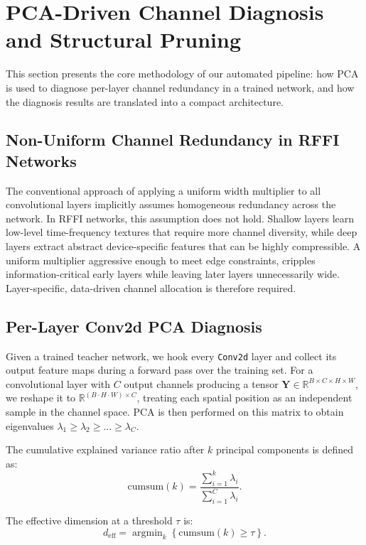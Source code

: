 \documentclass[10pt, conference]{IEEEtran}
\DeclareMathOperator*{\argmin}{argmin}
\begin{document}
\section{PCA-Driven Channel Diagnosis and Structural Pruning}

This section presents the core methodology of our automated pipeline: how PCA is used to diagnose per-layer channel redundancy in a trained network, and how the diagnosis results are translated into a compact architecture.

\subsection{Non-Uniform Channel Redundancy in RFFI Networks}

The conventional approach of applying a uniform width multiplier to all convolutional layers implicitly assumes homogeneous redundancy across the network.
In RFFI networks, this assumption does not hold.
Shallow layers learn low-level time-frequency textures that require more channel diversity, while deep layers extract abstract device-specific features that can be highly compressible.
A uniform multiplier aggressive enough to meet edge constraints, cripples information-critical early layers while leaving later layers unnecessarily wide.
Layer-specific, data-driven channel allocation is therefore required.

\subsection{Per-Layer Conv2d PCA Diagnosis}

Given a trained teacher network, we hook every \texttt{Conv2d} layer and collect its output feature maps during a forward pass over the training set.
For a convolutional layer with $C$ output channels producing a tensor $\mathbf{Y} \in \mathbb{R}^{B \times C \times H \times W}$, we reshape it to $\mathbb{R}^{(B\cdot H\cdot W) \times C}$, treating each spatial position as an independent sample in the channel space.
PCA is then performed on this matrix to obtain eigenvalues $\lambda_1 \ge \lambda_2 \ge \dots \ge \lambda_C$.

The cumulative explained variance ratio after $k$ principal components is defined as:
\begin{equation}
\label{eq:cumsum}
\text{cumsum}(k) = \frac{\sum_{i=1}^{k} \lambda_i}{\sum_{i=1}^{C} \lambda_i}.
\end{equation}

The effective dimension at a threshold $\tau$ is:
\begin{equation}
\label{eq:eff_dim}
d_{\text{eff}} = \argmin_k \left\{ \text{cumsum}(k) \geq \tau \right\}.
\end{equation}
\end{document}
